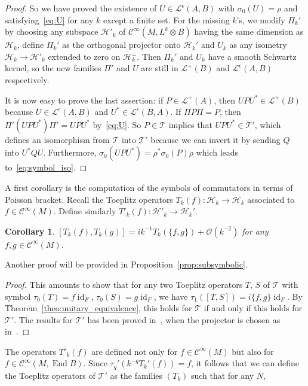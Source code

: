 \documentclass[10pt,a4paper]{article}
\newtheorem{coro}[theo]{Corollary}
\theoremstyle{definition}
\numberwithin{equation}{section}
\newcommand{\si}{{\sigma}}
\newcommand{\ep}{\epsilon}
\newcommand{\op}{\operatorname}
\newcommand{\Ci}{{\mathcal{C}}^{\infty}}
\newcommand{\bigo}{\mathcal{O}}
\newcommand{\lag}{\mathcal{L}}
\newcommand{\Hilb}{\mathcal{H}}
\newcommand{\clT}{\mathcal{T}}
\begin{document}
\begin{proof}
So we have proved the existence of $U \in \lag^{\ep}(A,B)$ with $\si_0(U) = \rho$ and satisfying~\eqref{eq:U} for any $k$ except a finite set. For the missing $k$'s, we modify $\Pi_k'$ by choosing any subspace $\Hilb'_k$ of $\Ci (M, L^k \otimes B)$ having the same dimension as $\Hilb_k$, define $\Pi_k'$ as the orthogonal projector onto $\Hilb_k'$ and $U_k$ as any isometry $\Hilb_k \rightarrow \Hilb'_k$ extended to zero on $\Hilb_k^{\perp}$. Then $\Pi_k'$ and $U_k$ have a smooth Schwartz kernel, so the new families $\Pi '$ and $U$ are still in $\lag ^{+} (B)$ and $\lag ^{\ep} (A,B)$ respectively.

It is now easy to prove the last assertion: if $P \in \lag ^{+} (A)$, then $U P U^* \in \lag ^{+}(B)$ because $U \in \lag ^{\ep} (A,B)$ and $U^* \in
\lag^{\ep} (B,A)$. If $ \Pi P \Pi = P$, then $\Pi' (U P U^*) \Pi' = U P U^*$ by~\eqref{eq:U}. So $P \in \clT$ implies that $U P U^* \in
\clT'$, which defines an isomorphism from $\clT$ into $\clT'$ because we can invert it by sending $Q$ into $U^* Q U$. Furthermore, $\si_0 (UPU^*) = \rho^* \si_0 (P)
\rho$ which leads to~\eqref{eq:symbol_iso}.
\end{proof}

A first corollary is the computation of the symbols of commutators in terms of Poisson bracket. Recall the Toeplitz operators $T_k (f) : \Hilb_k
\rightarrow \Hilb_k$ associated to $f \in \Ci (M)$. Define similarly $T'_k (f) : \Hilb'_k \rightarrow \Hilb_k'$.

\begin{coro}
$ [T_k (f), T_k (g)] = i k^{-1} T_k (\{ f,g \}) + \bigo (k^{-2})$ for any $f, g \in \Ci (M)$.
\end{coro}
Another proof will be provided in Proposition~\ref{prop:subsymbolic}.

\begin{proof}
This amounts to show that for any two Toeplitz operators $T$, $S$ of
$\clT$ with symbol $\tau_0(T) = f \op{id}_F$, $\tau_0(S) = g
\op{id}_F$, we have $\tau_1 ([T,S]) = i \{ f, g\} \op{id}_F$. By Theorem~\ref{theo:unitary_equivalence}, this holds for $\clT$ if and only if this holds for $\clT'$.  The results for $\clT'$ has been proved in~\cite[Theorem~1.4]{oim}, when the projector is chosen as in~\cite[Theorem~1.1]{oim}.
\end{proof}

The operators $T'_k(f)$ are defined not only for $f \in \Ci (M)$ but also for $f \in \Ci (M, \op{End} B)$. Since $\tau_q'(k^{-q} T_k' (f)) = f$, it follows that we can define the Toeplitz operators of $\clT'$ as the families $(T_k)$ such that for any $N$,
\end{document}
